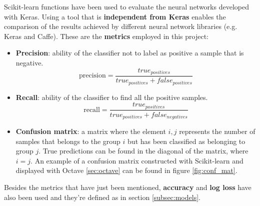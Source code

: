 Scikit-learn functions have been used to evaluate the neural networks developed with Keras. Using a tool that is \textbf{independent from Keras} enables the comparison of the results achieved by different neural network libraries (e.g. Keras and Caffe). These are the \textbf{metrics} employed in this project:
\begin{itemize}
	\item \textbf{Precision}: ability of the classifier not to label as positive a sample that is negative.
	\begin{equation}\label{eq:precision}
	\textrm{precision}=\frac{true_{positives}}{true_{positives}+false_{positives}}
	\end{equation}
	
	\item \textbf{Recall}: ability of the classifier to find all the positive samples.
	\begin{equation}\label{eq:recall}
	\textrm{recall}=\frac{true_{positives}}{true_{positives}+false_{negatives}}
	\end{equation}
	
	\item \textbf{Confusion matrix}: a matrix where the element $i,j$ represents the number of samples that belongs to the group $i$ but has been classified as belonging to group $j$. True predictions can be found in the diagonal of the matrix, where $i=j$. An example of a confusion matrix constructed with Scikit-learn and displayed with Octave \ref{sec:octave} can be found in figure \ref{fig:conf_mat}.
\end{itemize}

Besides the metrics that have just been mentioned, \textbf{accuracy} and \textbf{log loss} have also been used and they're defined as in section \ref{subsec:models}.

